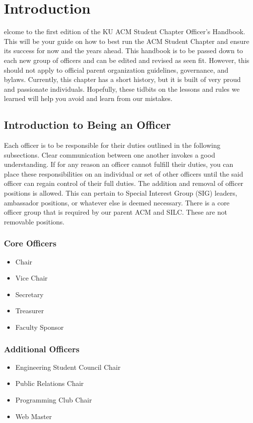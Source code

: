 %
%
\let\textcircled=\pgftextcircled
\chapter{Introduction}
\label{chap:intro}

elcome to the first edition of the KU ACM Student Chapter Officer's Handbook. This will be your guide on how to best run the ACM Student Chapter and ensure its success for now and the years ahead. This handbook is to be passed down to each new group of officers and can be edited and revised as seen fit. However, this should not apply to official parent organization guidelines, governance, and bylaws. Currently, this chapter has a short history, but it is built of very proud and passionate individuals. Hopefully, these tidbits on the lessons and rules we learned will help you avoid and learn from our mistakes.

\section{Introduction to Being an Officer}
\label{sec:sec01}

Each officer is to be responsible for their duties outlined in the following subsections. Clear communication between one another invokes a good understanding. If for any reason an officer cannot fulfill their duties, you can place these responsibilities on an individual or set of other officers until the said officer can regain control of their full duties. The addition and removal of officer positions is allowed. This can pertain to Special Interest Group (SIG) leaders, ambassador positions, or whatever else is deemed necessary. There is a core officer group that is required by our parent ACM and SILC. These are not removable positions.

\subsection{Core Officers}
\label{subsec:subsec01}

\begin{itemize}
	\item Chair
    \item Vice Chair
    \item Secretary
    \item Treasurer
    \item Faculty Sponsor
\end{itemize}

\subsection{Additional Officers}
\label{subsec:subsec02}

\begin{itemize}
	\item Engineering Student Council Chair
    \item Public Relations Chair
    \item Programming Club Chair
    \item Web Master
\end{itemize}

